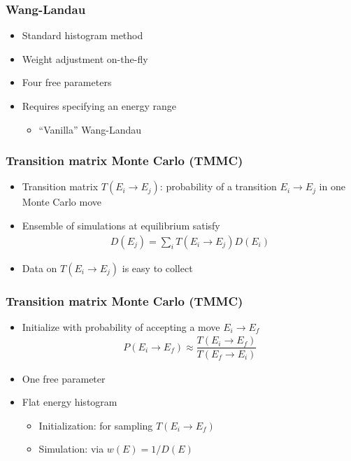 \documentclass{beamer}
\newcommand{\f}[2]{\dfrac{#1}{#2}} %
\newcommand{\p}[1]{\left(#1\right)} %
\let\olditem\item
\renewcommand{\item}{\setlength{\itemsep}{6pt}\olditem}
\begin{document}
\begin{frame}
  \frametitle{Wang-Landau}
  \begin{itemize}
  \item Standard histogram method
  \item Weight adjustment on-the-fly
  \item Four free parameters
  \item Requires specifying an energy range
    \begin{itemize}
    \item ``Vanilla'' Wang-Landau
    \end{itemize}
  \end{itemize}
\end{frame}

\begin{frame}
  \frametitle{Transition matrix Monte Carlo (TMMC)}
  \begin{itemize}
  \item Transition matrix $T\p{E_i\to E_j}$: probability of a
    transition $E_i\to E_j$ in one Monte Carlo move
  \item Ensemble of simulations at equilibrium satisfy
    \begin{align*}
      D\p{E_j}=\sum_iT\p{E_i\to E_j}D\p{E_i}
    \end{align*}
  \item Data on $T\p{E_i\to E_j}$ is easy to collect
  \end{itemize}
\end{frame}

\begin{frame}
  \frametitle{Transition matrix Monte Carlo (TMMC)}
  \begin{itemize}
  \item Initialize with probability of accepting a move $E_i\to E_f$
    \begin{align*}
      P\p{E_i\to E_f}\approx\f{T\p{E_i\to E_f}}{T\p{E_f\to E_i}}
    \end{align*}
  \item One free parameter
  \item Flat energy histogram
    \begin{itemize}
    \item Initialization: for sampling $T\p{E_i\to E_f}$
    \item Simulation: via $w\p{E}=1/D\p{E}$
    \end{itemize}
  \end{itemize}
\end{frame}
\end{document}
